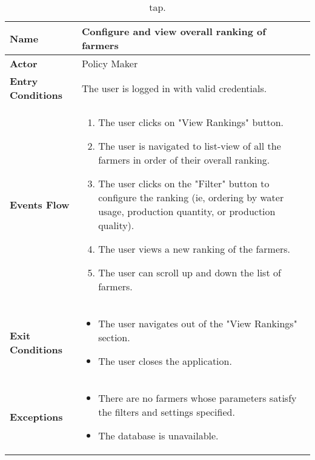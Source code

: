 
\begin{table}[hbt!]
\centering
\caption{\label{tab:addOne{table_counter}}tap.}
\renewcommand{\arraystretch}{1.25}
\begin{tabular}{|l|>{\raggedright\arraybackslash}m{12cm}|}

    \hline
    \textbf{Name} & Configure and view overall ranking of farmers\\
    \hline
   	\textbf{Actor} & Policy Maker\\
    \hline
    \textbf{Entry Conditions} & The user is logged in with valid credentials.\\
    \hline
    \textbf{Events Flow} & 
    \begin{enumerate}
   	\item The user clicks on "View Rankings" button.
   	\item The user is navigated to list-view of all the farmers in order of their overall ranking. 
    \item The user clicks on the "Filter" button to configure the ranking (ie, ordering by water usage, production quantity, or production quality). 
    	\item The user views a new ranking of the farmers. 
    	\item The user can scroll up and down the list of farmers.
    \end{enumerate} \\ \hline
    \textbf{Exit Conditions} & 
    \begin{itemize}
    	\item The user navigates out of the "View Rankings" section. 
    	\item The user closes the application.
    \end{itemize}\\
    \hline
    \textbf{Exceptions} & 
    \begin{itemize}
    	\item There are no farmers whose parameters satisfy the filters and settings specified.
    	\item The database is unavailable.
    \end{itemize}\\
    \hline
\end{tabular}
\end{table}